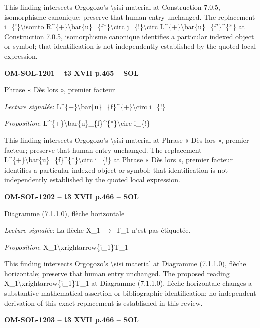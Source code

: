 This finding intersects Orgogozo's \textbackslash{}sisi material at Construction 7.0.5, isomorphisme canonique; preserve that human entry unchanged. The replacement i\_\{!\}\textbackslash{}isomto R\textasciicircum{}\{+\}\textbackslash{}bar\{u\}\_\{f*\}\textbackslash{}circ j\_\{!\}\textbackslash{}circ L\textasciicircum{}\{+\}\textbackslash{}bar\{u\}\_\{f'\}\textasciicircum{}\{*\} at Construction 7.0.5, isomorphisme canonique identifies a particular indexed object or symbol; that identification is not independently established by the quoted local expression.\par
\par\noindent\textbf{OM-SOL-1201 -- t3 XVII p.465 -- SOL}\par
Phrase « Dès lors », premier facteur\par
\emph{Lecture signalée}: L\textasciicircum{}\{+\}\textbackslash{}bar\{u\}\_\{f\}\textasciicircum{}\{+\}\textbackslash{}circ i\_\{!\}\par
\emph{Proposition}: L\textasciicircum{}\{+\}\textbackslash{}bar\{u\}\_\{f\}\textasciicircum{}\{*\}\textbackslash{}circ i\_\{!\}\par
This finding intersects Orgogozo's \textbackslash{}sisi material at Phrase « Dès lors », premier facteur; preserve that human entry unchanged. The replacement L\textasciicircum{}\{+\}\textbackslash{}bar\{u\}\_\{f\}\textasciicircum{}\{*\}\textbackslash{}circ i\_\{!\} at Phrase « Dès lors », premier facteur identifies a particular indexed object or symbol; that identification is not independently established by the quoted local expression.\par
\par\noindent\textbf{OM-SOL-1202 -- t3 XVII p.466 -- SOL}\par
Diagramme (7.1.1.0), flèche horizontale\par
\emph{Lecture signalée}: La flèche X\_1 \ensuremath{\to} T\_1 n'est pas étiquetée.\par
\emph{Proposition}: X\_1\textbackslash{}xrightarrow\{j\_1\}T\_1\par
This finding intersects Orgogozo's \textbackslash{}sisi material at Diagramme (7.1.1.0), flèche horizontale; preserve that human entry unchanged. The proposed reading X\_1\textbackslash{}xrightarrow\{j\_1\}T\_1 at Diagramme (7.1.1.0), flèche horizontale changes a substantive mathematical assertion or bibliographic identification; no independent derivation of this exact replacement is established in this review.\par
\par\noindent\textbf{OM-SOL-1203 -- t3 XVII p.466 -- SOL}\par
